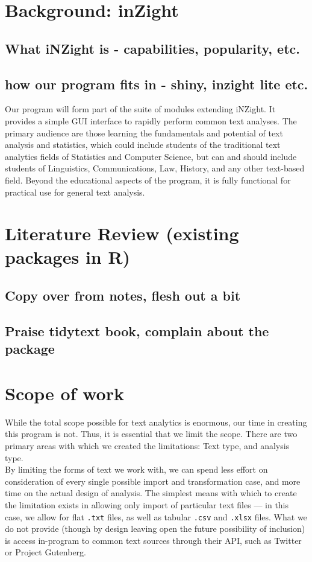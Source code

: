 \documentclass[11pt, a4paper, oneside]{report}
\begin{document}
\section{Background: inZight}
\label{sec:background:-inzight}
\subsection{What iNZight is - capabilities, popularity, etc.}
\subsection{how our program fits in - shiny, inzight lite etc.}
Our program will form part of the suite of modules extending iNZight.
It provides a simple GUI interface to rapidly perform common text
analyses. The primary audience are those learning the fundamentals and
potential of text analysis and statistics, which could include
students of the traditional text analytics fields of Statistics and
Computer Science, but can and should include students of Linguistics,
Communications, Law, History, and any other text-based field. Beyond
the educational aspects of the program, it is fully functional for
practical use for general text analysis.
\section{Literature Review (existing packages in R)}
\label{sec:liter-revi-exist}

\subsection{Copy over from notes, flesh out a bit}

\subsection{Praise tidytext book, complain about the package}

\section{Scope of work}
\label{sec:scope-work}
While the total scope possible for text analytics is enormous, our
time in creating this program is not. Thus, it is essential that we
limit the scope. There are two primary areas with which we created the
limitations: Text type, and analysis type.\\

By limiting the forms of text we work with, we can spend less effort
on consideration of every single possible import and transformation
case, and more time on the actual design of analysis. The simplest
means with which to create the limitation exists in allowing only
import of particular text files --- in this case, we allow for flat
\texttt{.txt} files, as well as tabular \texttt{.csv} and
\texttt{.xlsx} files. What we do not provide (though by design leaving
open the future possibility of inclusion) is access in-program to
common text sources through their API, such as Twitter or Project
Gutenberg.\\
\end{document}
